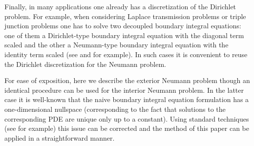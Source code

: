 Finally, in many applications one already has a discretization of the Dirichlet problem. For example, when considering Laplace transmission problems or triple junction problems one has to solve two decoupled boundary integral equations: one of them a Dirichlet-type boundary integral equation with the diagonal term scaled and the other a Neumann-type boundary integral equation with the identity term scaled (see \cite{hoskins2018numerical} and \cite{hoskins2019solution} for example). In such cases it is convenient to reuse the Dirichlet discretization for the Neumann problem.  

{\color{olive}For ease of exposition, here we describe the exterior Neumann problem though an identical procedure can be used for the interior Neumann problem. In the latter case it is well-known that the naive boundary integral equation formulation has a one-dimensional nullspace (corresponding to the fact that solutions to the corresponding PDE are unique only up to a constant). Using standard techniques (see \cite{} for example) this issue can be corrected and the method of this paper can be applied in a straightforward manner.}
